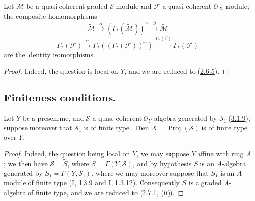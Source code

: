 \begin{proposition}[3.3.5]
\label{II.3.3.5}
Let $\mathcal{M}$ be a quasi-coherent graded $\mathcal{S}$-module and
$\mathcal{F}$ a quasi-coherent $\mathcal{O}_X$-module; the composite
homomorphisms
\[
\label{II.3.3.5.1}
  \widetilde{\mathcal{M}}
  \xrightarrow{\widetilde{\alpha}}
  (\Gamma_*(\widetilde{\mathcal{M}}))^{\sim}
  \xrightarrow{\beta}\widetilde{\mathcal{M}}
\tag{3.3.5.1}
\]
\[
\label{II.3.3.5.2}
  \Gamma_*(\mathcal{F})\xrightarrow{\alpha}
  \Gamma_*((\Gamma_*(\mathcal{F}))^{\sim})
  \xrightarrow{\Gamma_*(\beta)}\Gamma_*(\mathcal{F})
\tag{3.3.5.2}
\]
are the identity isomorphisms.
\end{proposition}

\begin{proof}
Indeed, the question is local on $Y$, and we are reduced to
(\hyperref[II.2.6.5]{2.6.5}).
\end{proof}


\subsection{Finiteness conditions.}
\label{subsection:II.3.4}


\begin{proposition}[3.4.1]
\label{II.3.4.1}
Let $Y$ be a prescheme, and $\mathcal{S}$ a quasi-coherent $\mathcal{O}_Y$-algebra
generated by $\mathcal{S}_1$
(\hyperref[II.3.1.9]{3.1.9}); suppose moreover that $\mathcal{S}_1$ is of
finite type. Then $X=\operatorname{Proj}(\mathcal{S})$ is of finite type over
$Y$.
\end{proposition}

\begin{proof}
Indeed, the question being local on $Y$, we may suppose $Y$ affine
with ring $A$; we then have $\mathcal{S}=\widetilde{S}$, where
$S=\Gamma(Y,\mathcal{S})$, and by hypothesis $S$ is an $A$-algebra generated
by $S_1=\Gamma(Y,\mathcal{S}_1)$, where we may moreover suppose that $S_1$ is
an $A$-module of finite type
(\hyperref[I.1.3.9]{I, 1.3.9} and
\hyperref[I.1.3.12]{I, 1.3.12}). Consequently $S$ is a graded $A$-algebra
of finite type, and we are reduced to
(\hyperref[II.2.7.1]{2.7.1, (ii)}).
\end{proof}

